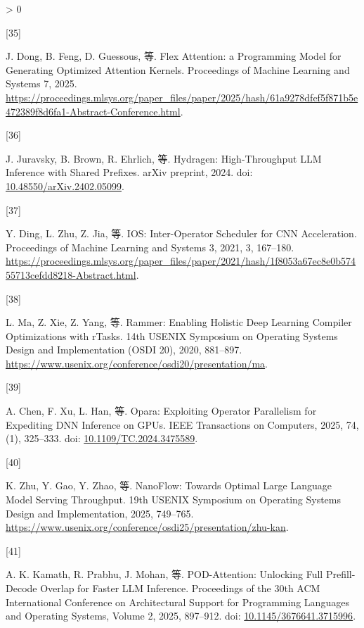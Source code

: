 \documentclass[
  UTF8,
  zihao=5]{ctexart}
\newlength{\cslhangindent}
\newlength{\csllabelwidth}
\newenvironment{CSLReferences}[2] %
 {%
  \setlength{\parindent}{0pt}
  \ifodd #1 \everypar{\setlength{\hangindent}{\cslhangindent}}\ignorespaces\fi
  \ifnum #2 > 0
  \setlength{\parskip}{#2\baselineskip}
  \fi
 }%
 {}
\newcommand{\CSLLeftMargin}[1]{\parbox[t]{\csllabelwidth}{#1}}
\newcommand{\CSLRightInline}[1]{\parbox[t]{\linewidth - \csllabelwidth}{#1}\par}
\begin{document}
\begin{CSLReferences}{0}{0}
\leavevmode{}%
\CSLLeftMargin{{[}35{]} }%
\CSLRightInline{J. Dong, B. Feng, D. Guessous, 等. Flex Attention: a
Programming Model for Generating Optimized Attention Kernels.
Proceedings of Machine Learning and Systems 7, 2025.
\url{https://proceedings.mlsys.org/paper_files/paper/2025/hash/61a9278dfef5f871b5e472389f8d6fa1-Abstract-Conference.html}.}

\leavevmode{}%
\CSLLeftMargin{{[}36{]} }%
\CSLRightInline{J. Juravsky, B. Brown, R. Ehrlich, 等. Hydragen:
High-Throughput LLM Inference with Shared Prefixes. arXiv preprint,
2024. doi:
\href{https://doi.org/10.48550/arXiv.2402.05099}{10.48550/arXiv.2402.05099}.}

\leavevmode{}%
\CSLLeftMargin{{[}37{]} }%
\CSLRightInline{Y. Ding, L. Zhu, Z. Jia, 等. IOS: Inter-Operator
Scheduler for CNN Acceleration. Proceedings of Machine Learning and
Systems 3, 2021, 3, 167--180.
\url{https://proceedings.mlsys.org/paper_files/paper/2021/hash/1f8053a67ec8e0b57455713cefdd8218-Abstract.html}.}

\leavevmode{}%
\CSLLeftMargin{{[}38{]} }%
\CSLRightInline{L. Ma, Z. Xie, Z. Yang, 等. Rammer: Enabling Holistic
Deep Learning Compiler Optimizations with rTasks. 14th USENIX Symposium
on Operating Systems Design and Implementation (OSDI 20), 2020,
881--897.
\url{https://www.usenix.org/conference/osdi20/presentation/ma}.}

\leavevmode{}%
\CSLLeftMargin{{[}39{]} }%
\CSLRightInline{A. Chen, F. Xu, L. Han, 等. Opara: Exploiting Operator
Parallelism for Expediting DNN Inference on GPUs. IEEE Transactions on
Computers, 2025, 74, (1), 325--333. doi:
\href{https://doi.org/10.1109/TC.2024.3475589}{10.1109/TC.2024.3475589}.}

\leavevmode{}%
\CSLLeftMargin{{[}40{]} }%
\CSLRightInline{K. Zhu, Y. Gao, Y. Zhao, 等. {NanoFlow: Towards Optimal
Large Language Model Serving Throughput}. 19th USENIX Symposium on
Operating Systems Design and Implementation, 2025, 749--765.
\url{https://www.usenix.org/conference/osdi25/presentation/zhu-kan}.}

\leavevmode{}%
\CSLLeftMargin{{[}41{]} }%
\CSLRightInline{A. K. Kamath, R. Prabhu, J. Mohan, 等. {POD-Attention:
Unlocking Full Prefill-Decode Overlap for Faster LLM Inference}.
Proceedings of the 30th ACM International Conference on Architectural
Support for Programming Languages and Operating Systems, Volume 2, 2025,
897--912. doi:
\href{https://doi.org/10.1145/3676641.3715996}{10.1145/3676641.3715996}.}


\end{CSLReferences}
\end{document}
